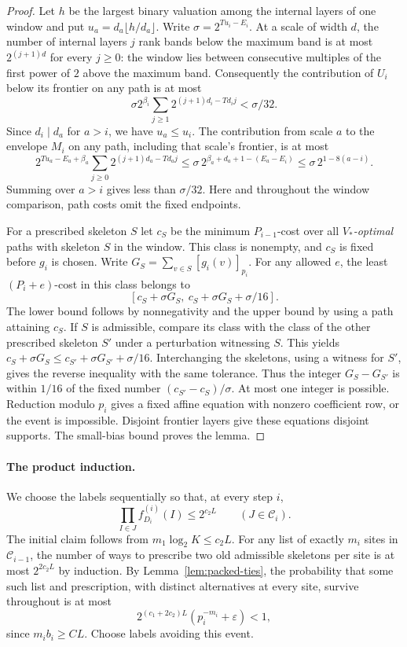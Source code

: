 \documentclass[11pt]{article}
\begin{document}
\begin{proof}
Let $h$ be the largest binary valuation among the internal layers of
one window and put $u_a=d_a\lfloor h/d_a\rfloor$. Write
$\sigma=2^{T u_i-E_i}$. At a scale of width $d$, the number of internal
layers $j$ rank bands below the maximum band is at most $2^{(j+1)d}$
for every $j\ge0$: the window lies between consecutive multiples of the
first power of $2$ above the maximum band. Consequently the contribution
of $U_i$ below its frontier on any path is at most
\[
 \sigma 2^{\beta_i}\sum_{j\ge1}2^{(j+1)d_i-Td_i j}<\sigma/32.
\]
Since $d_i\mid d_a$ for $a>i$, we have $u_a\le u_i$. The contribution
from scale $a$ to the envelope $M_i$ on any path, including that
scale's frontier, is at most
\[
 2^{T u_a-E_a+\beta_a}\sum_{j\ge0}2^{(j+1)d_a-Td_a j}
 \le \sigma\,2^{\beta_a+d_a+1-(E_a-E_i)}
 \le \sigma\,2^{1-8(a-i)} .
\]
Summing over $a>i$ gives less than $\sigma/32$. Here and throughout the window comparison, path costs omit the fixed endpoints.

For a prescribed skeleton $S$ let $c_S$ be the minimum $P_{i-1}$-cost
over all \emph{$V_*$-optimal} paths with skeleton $S$ in the window.
This class is nonempty, and $c_S$ is fixed before $g_i$ is chosen.
Write $G_S=\sum_{v\in S}[g_i(v)]_{p_i}$. For any allowed $e$, the
least $(P_i+e)$-cost in this class belongs to
\[
               [c_S+\sigma G_S,\ c_S+\sigma G_S+\sigma/16].
\]
The lower bound follows by nonnegativity and the upper bound by using a
path attaining $c_S$. If $S$ is admissible, compare its class with the
class of the other prescribed skeleton $S'$ under a perturbation witnessing
$S$. This yields $c_S+\sigma G_S\le c_{S'}+\sigma G_{S'}+\sigma/16$.
Interchanging the skeletons, using a witness for $S'$, gives the reverse
inequality with the same tolerance. Thus the integer $G_S-G_{S'}$ is
within $1/16$ of the fixed number $(c_{S'}-c_S)/\sigma$. At most one
integer is possible. Reduction modulo $p_i$ gives a fixed affine equation
with nonzero coefficient row, or the event is impossible. Disjoint
frontier layers give these equations disjoint supports. The small-bias
bound proves the lemma.
\end{proof}

\paragraph{The product induction.}
We choose the labels sequentially so that, at every step $i$,
\[
          \prod_{I\in J} f_{D_i}^{(i)}(I)\le 2^{c_2 L}
                    \qquad (J\in\mathcal C_i).
\]
The initial claim follows from $m_1\log_2 K\le c_2 L$.
For any list of exactly $m_i$ sites in $\mathcal C_{i-1}$, the number
of ways to prescribe two old admissible skeletons per site is at most
$2^{2c_2 L}$ by induction. By Lemma~\ref{lem:packed-ties}, the probability
that some such list and prescription, with distinct alternatives at
every site, survive throughout is at most
\[
            2^{(c_1+2c_2)L}(p_i^{-m_i}+\varepsilon)<1,
\]
since $m_i b_i\ge C L$. Choose labels avoiding this event.
\end{document}
